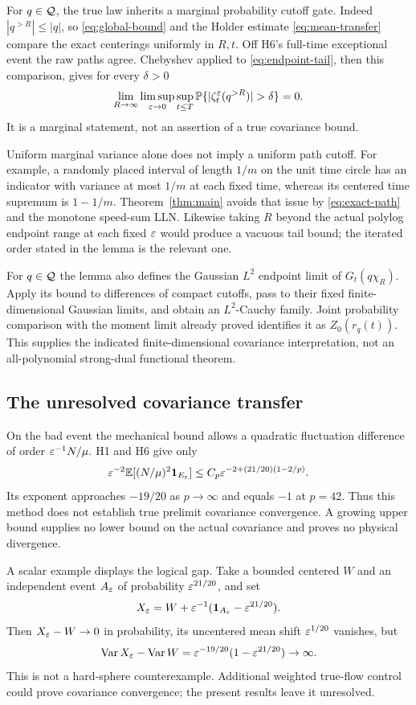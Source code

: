 For $q\in\mathcal Q$, the true law inherits a marginal probability cutoff gate.
Indeed $|q^{>R}|\le|q|$, so \eqref{eq:global-bound} and the Holder estimate
\eqref{eq:mean-transfer} compare the exact centerings uniformly in $R,t$.
Off H6's full-time exceptional event the raw paths agree. Chebyshev applied
to \eqref{eq:endpoint-tail}, then this comparison, gives for every $\delta>0$
\[
 \lim_{R\to\infty}\limsup_{\eps\to0}\sup_{t\le T}
           \Prob\{|\zeta_t^\eps(q^{>R})|>\delta\}=0.
\]
It is a marginal statement, not an assertion of a true covariance bound.

Uniform marginal variance alone does not imply a uniform path cutoff. For
example, a randomly placed interval of length $1/m$ on the unit time circle
has an indicator with variance at most $1/m$ at each fixed time, whereas its
centered time supremum is $1-1/m$. Theorem~\ref{thm:main} avoids that issue
by \eqref{eq:exact-path} and the monotone speed-sum LLN.
Likewise taking $R$ beyond the actual polylog endpoint range at each fixed
$\varepsilon$ would produce a vacuous tail bound; the iterated order stated in the
lemma is the relevant one.

For $q\in\mathcal Q$ the lemma also defines the Gaussian $L^2$ endpoint limit
of $G_t(q\chi_R)$. Apply its bound to differences of compact cutoffs,
pass to their fixed finite-dimensional Gaussian limits, and obtain an
$L^2$-Cauchy family. Joint probability comparison with the moment limit
already proved identifies it as $Z_0(r_q(t))$. This supplies the indicated
finite-dimensional covariance interpretation, not an all-polynomial
strong-dual functional theorem.

\subsection{The unresolved covariance transfer}
On the bad event the mechanical bound allows a quadratic fluctuation
difference of order $\varepsilon^{-1}N/\mu$. H1 and H6 give only
\begin{equation}\label{eq:failed-L2-transfer}
 \varepsilon^{-2}\mathbb E[(N/\mu)^2\mathbf 1_{E_\varepsilon}]
       \le C_p\varepsilon^{-2+(21/20)(1-2/p)}.
\end{equation}
Its exponent approaches $-19/20$ as $p\to\infty$ and equals $-1$ at
$p=42$. Thus this method does not establish true prelimit covariance
convergence. A growing upper bound supplies no lower bound on the actual
covariance and proves no physical divergence.

A scalar example displays the logical gap. Take a bounded centered $W$
and an independent event $A_\varepsilon$ of probability $\varepsilon^{21/20}$, and set
\[
 X_\varepsilon=W+\varepsilon^{-1}(\mathbf 1_{A_\varepsilon}-\varepsilon^{21/20}).
\]
Then $X_\varepsilon-W\to0$ in probability, its uncentered mean shift
$\varepsilon^{1/20}$ vanishes, but
\[
 \operatorname{Var}X_\varepsilon-\operatorname{Var}W
        =\varepsilon^{-19/20}(1-\varepsilon^{21/20})\to\infty.
\]
This is not a hard-sphere counterexample. Additional weighted true-flow
control could prove covariance convergence; the present results leave it
unresolved.

